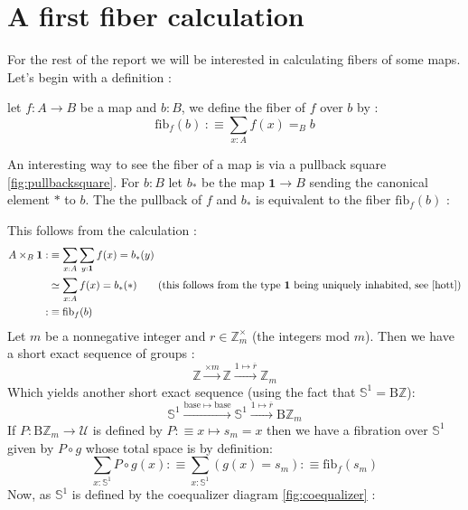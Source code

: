 \documentclass{report}
\begin{document}
\section{A first fiber calculation}
For the rest of the report we will be interested in calculating fibers of some maps. Let's begin with a definition : 
\begin{mydef}
  let $f : A \rightarrow B$ be a map and $b : B$, we define the fiber of $f$ over $b$ by : 
  $$\mathrm{fib}_f(b) \hspace{3pt} :\equiv \sum_{x: A} f(x)=_B b$$
\end{mydef}
An interesting way to see the fiber of a map is via a pullback square \ref{fig:pullbacksquare}. For $b :B$ let $b_*$ be the map $\mathbf{1} \rightarrow B$ sending the canonical element $*$ to $b$. The the pullback of $f$ and $b_*$ is equivalent to the fiber $\mathrm{fib}_f(b)$ : 
\begin{center}
\end{center}
This follows from the calculation : 
\begin{align}
A \times_B \textbf{1} :
&\equiv \sum_{x :A} \sum_{y : \textbf{1}} f(x)=b_*(y)\\
&\simeq \sum_{x : A} f(x)=b_*(*) \text{\quad \quad (this follows from the type \textbf{1} being uniquely inhabited, see \cite{hott})}\\
:&\equiv\mathrm{fib}_f(b)
\end{align}
Let $m$ be a nonnegative integer and $r \in \mathbb{Z}_m^{\times}$ (the integers mod $m$). Then we have a short exact sequence of groups : 
$$\mathbb{Z} \xrightarrow{\times m} \mathbb{Z} \xrightarrow{1 \mapsto \overline r} \mathbb Z_m$$
Which yields another short exact sequence (using the fact that $\mathbb{S}^1 = \mathrm{B} \mathbb Z$):
$$\mathbb{S}^1 \xrightarrow{\mathrm{base} \mapsto \mathrm{base}} \mathbb{S}^1 \xrightarrow{1 \mapsto \overline r} \mathrm{B}\mathbb{Z}_m$$
If $P : \mathrm{B}\mathbb{Z}_m \rightarrow \mathcal{U}$ is defined by $P :\equiv x \mapsto s_m = x$ then we have a fibration over $\mathbb{S}^1$ given by $P \circ g$ whose total space is by definition:
$$\sum_{x : \mathbb{S}^1} P \circ g (x) :\equiv \sum_{x : \mathbb{S}^1}(g(x)=s_m) :\equiv \mathrm{fib}_f(s_m)$$ 
Now, as $\mathbb{S}^1$ is defined by the coequalizer diagram \ref{fig:coequalizer} :
\end{document}
